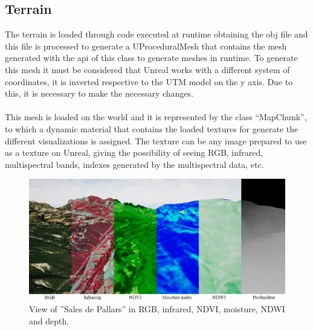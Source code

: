 \documentclass[10pt,a4paper,twocolumn,twoside]{article}
\begin{document}
\subsection{Terrain}
The terrain is loaded through code executed at runtime obtaining the obj file and this file is processed to generate a UProceduralMesh \cite{uprocedural} that contains the mesh generated with the api of this class to generate meshes in runtime. To generate this mesh it must be considered that Unreal works with a different system of coordinates, it is inverted respective to the UTM model on the y axis. Due to this, it is necessary to make the necessary changes.
\\
\\
This mesh is loaded on the world and it is represented by the class ``MapChunk'', to which a dynamic material that contains the loaded textures for generate the different visualizations is assigned. The texture can be any image prepared to use as a texture on Unreal, giving the possibility of seeing RGB, infrared, multispectral bands, indexes generated by the multispectral data, etc.

\begin{figure}[!h]
\centering
  	\includegraphics[width=1\textwidth]{multispectral/spectralindexes}
	\caption{View of ''Sales de Pallars'' in RGB, infrared, NDVI, moisture, NDWI and depth.}
	\label{fig-spectralindexes}
\end{figure}
\end{document}
